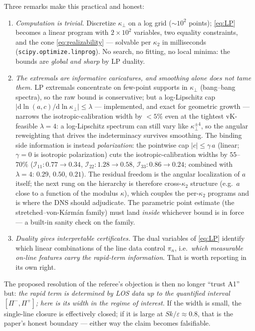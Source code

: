 \documentclass[11pt,a4paper]{article}
\newcommand{\kperp}{\kappa_\perp}
\newcommand{\dd}{\mathrm{d}}
\begin{document}
Three remarks make this practical and honest:
\begin{enumerate}[leftmargin=2em]
\item \emph{Computation is trivial.} Discretize $\kperp$ on a log grid
  ($\sim10^2$ points); \eqref{eq:LP} becomes a linear program with
  $2\times10^2$ variables, two equality constraints, and the cone
  \eqref{eq:realizability} --- solvable per $\kappa_2$ in milliseconds
  (\texttt{scipy.optimize.linprog}). No search, no fitting, no local minima:
  the bounds are \emph{global and sharp} by LP duality.
\item \emph{The extremals are informative caricatures, and smoothing alone
  does not tame them.} LP extremals concentrate on few-point supports in
  $\kperp$ (bang--bang spectra), so the raw bound is conservative; but a
  log-Lipschitz cap $|\dd\ln(a,c)/\dd\ln\kperp|\le\lambda$ --- implemented,
  and exact for geometric growth --- narrows the isotropic-calibration width
  by $<5\%$ even at the tightest vK-feasible $\lambda=4$: a log-Lipschitz
  spectrum can still vary like $\kperp^{\pm4}$, so the angular reweighting
  that drives the indeterminacy survives smoothing. The binding side
  information is instead \emph{polarization}: the pointwise cap
  $|c|\le\gamma\,a$ (linear; $\gamma=0$ is isotropic polarization) cuts the
  isotropic-calibration widths by $55$--$70\%$
  ($\mathcal I_{11}\!: 0.77\!\to\!0.34$, $\mathcal I_{22}\!: 1.28\!\to\!0.58$,
  $\mathcal I_{33}\!: 0.86\!\to\!0.24$; combined with $\lambda=4$:
  $0.29$, $0.50$, $0.21$). The residual freedom is the angular localization
  of $a$ itself; the next rung on the hierarchy is therefore cross-$\kappa_2$
  structure (e.g.\ $a$ close to a function of the modulus $\kappa$), which
  couples the per-$\kappa_2$ programs and is where the DNS should adjudicate.
  The parametric point estimate (the stretched--von-K\'arm\'an family) must
  land \emph{inside} whichever bound is in force --- a built-in sanity check
  on the family.
\item \emph{Duality gives interpretable certificates.} The dual variables of
  \eqref{eq:LP} identify which linear combinations of the line data control
  $\pi_n$, i.e.\ \emph{which measurable on-line features carry the rapid-term
  information}. That is worth reporting in its own right.
\end{enumerate}

The proposed resolution of the referee's objection is then no longer ``trust
A1'' but: \emph{the rapid term is determined by LOS data up to the quantified
interval $[\Pi^-,\Pi^+]$; here is its width in the regime of interest.} If the
width is small, the single-line closure is effectively closed; if it is large
at $Sk/\varepsilon\approx0.8$, that is the paper's honest boundary --- either
way the claim becomes falsifiable.
\end{document}
